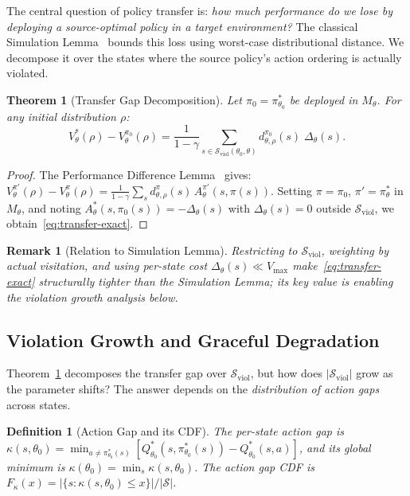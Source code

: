 \documentclass{article}
\newtheorem{definition}{Definition}
\newtheorem{theorem}{Theorem}
\newtheorem{remark}{Remark}
\newcommand{\cS}{\mathcal{S}}
\newcommand{\Sviol}{\mathcal{S}_{\mathrm{viol}}}
\newcommand{\Vmax}{V_{\max}}
\begin{document}
The central question of policy transfer is: \emph{how much performance do we lose by deploying a source-optimal policy in a target environment?} The classical Simulation Lemma~\citep{kearns2002near} bounds this loss using worst-case distributional distance. We decompose it over the states where the source policy's action ordering is actually violated.

\begin{theorem}[Transfer Gap Decomposition]
\label{thm:transfer-gap}
Let $\pi_0 = \pi^*_{\theta_0}$ be deployed in $M_{\theta}$. For any initial distribution $\rho$:
\begin{equation}
\label{eq:transfer-exact}
\boxed{V^*_{\theta}(\rho) - V^{\pi_0}_{\theta}(\rho) = \frac{1}{1-\gamma}\sum_{s \in \Sviol(\theta_0,\theta)} d^{\pi_0}_{\theta,\rho}(s)\;\Delta_{\theta}(s).}
\end{equation}
\end{theorem}

\begin{proof}
The Performance Difference Lemma~\citep{kakade2002approximately} gives:
$V^{\pi'}_\theta(\rho) - V^{\pi}_\theta(\rho) = \frac{1}{1-\gamma}\sum_{s} d^{\pi}_{\theta,\rho}(s)\,A^{\pi'}_\theta(s, \pi(s))$.
Setting $\pi = \pi_0$, $\pi' = \pi^*_{\theta}$ in $M_{\theta}$, and noting $A^*_{\theta}(s, \pi_0(s)) = -\Delta_{\theta}(s)$ with $\Delta_{\theta}(s) = 0$ outside $\Sviol$, we obtain~\eqref{eq:transfer-exact}.
\end{proof}

\begin{remark}[Relation to Simulation Lemma]
\label{rem:sim-lemma}
Restricting to $\Sviol$, weighting by actual visitation, and using per-state cost $\Delta_\theta(s) \ll \Vmax$ make~\eqref{eq:transfer-exact} structurally tighter than the Simulation Lemma; its key value is enabling the violation growth analysis below.
\end{remark}

\subsection{Violation Growth and Graceful Degradation}
\label{sec:violation-growth}

Theorem~\ref{thm:transfer-gap} decomposes the transfer gap over $\Sviol$, but how does $|\Sviol|$ grow as the parameter shifts? The answer depends on the \emph{distribution of action gaps} across states.

\begin{definition}[Action Gap and its CDF]
\label{def:gap-cdf}
The per-state action gap is $\kappa(s, \theta_0) = \min_{a \neq \pi^*_{\theta_0}(s)} [Q^*_{\theta_0}(s, \pi^*_{\theta_0}(s)) - Q^*_{\theta_0}(s, a)]$, and its global minimum is $\kappa(\theta_0) = \min_s \kappa(s, \theta_0)$. The action gap CDF is $F_\kappa(x) = |\{s : \kappa(s, \theta_0) \leq x\}| / |\cS|$.
\end{definition}
\end{document}
